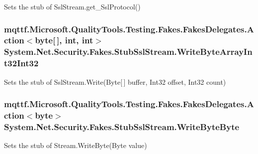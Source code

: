 Sets the stub of Ssl\-Stream.\-get\-\_\-\-Ssl\-Protocol()

\hypertarget{class_system_1_1_net_1_1_security_1_1_fakes_1_1_stub_ssl_stream_a4bba8228e55ccfd5b2865d7ab7b726bb}{
\subsubsection[{Write\-Byte\-Array\-Int32\-Int32}]{\setlength{\rightskip}{0pt plus 5cm}mqttf.\-Microsoft.\-Quality\-Tools.\-Testing.\-Fakes.\-Fakes\-Delegates.\-Action$<$byte\mbox{[}$\,$\mbox{]}, int, int$>$ System.\-Net.\-Security.\-Fakes.\-Stub\-Ssl\-Stream.\-Write\-Byte\-Array\-Int32\-Int32}}\label{class_system_1_1_net_1_1_security_1_1_fakes_1_1_stub_ssl_stream_a4bba8228e55ccfd5b2865d7ab7b726bb}


Sets the stub of Ssl\-Stream.\-Write(\-Byte\mbox{[}$\,$\mbox{]} buffer, Int32 offset, Int32 count)

\hypertarget{class_system_1_1_net_1_1_security_1_1_fakes_1_1_stub_ssl_stream_a5268099ec554afe0b6da967edbe53028}{
\subsubsection[{Write\-Byte\-Byte}]{\setlength{\rightskip}{0pt plus 5cm}mqttf.\-Microsoft.\-Quality\-Tools.\-Testing.\-Fakes.\-Fakes\-Delegates.\-Action$<$byte$>$ System.\-Net.\-Security.\-Fakes.\-Stub\-Ssl\-Stream.\-Write\-Byte\-Byte}}\label{class_system_1_1_net_1_1_security_1_1_fakes_1_1_stub_ssl_stream_a5268099ec554afe0b6da967edbe53028}


Sets the stub of Stream.\-Write\-Byte(\-Byte value)

